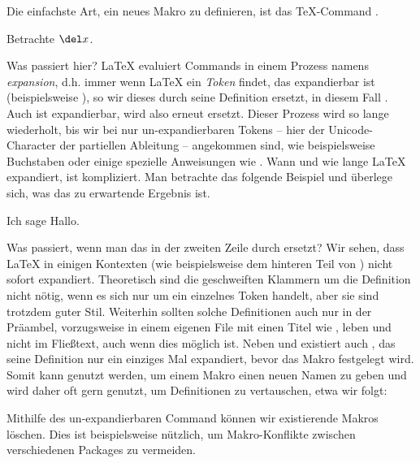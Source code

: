 Die einfachste Art, ein neues Makro zu definieren, ist das \TeX -Command .
\begin{latexlisting}
	\def\derivative{\del}

	Betrachte $\derivative x$.
\end{latexlisting}
Was passiert hier?
\LaTeX{} evaluiert Commands in einem Prozess namens \emph{expansion}, d.h. immer wenn \LaTeX{} ein \emph{Token} findet, das expandierbar ist (beispielsweise ), so wir dieses durch seine Definition ersetzt, in diesem Fall .
Auch  ist expandierbar, wird also erneut ersetzt.
Dieser Prozess wird so lange wiederholt, bis wir bei nur un-expandierbaren Tokens -- hier der Unicode-Character der partiellen Ableitung -- angekommen sind, wie beispielsweise Buchstaben oder einige spezielle Anweisungen wie .
Wann und wie lange \LaTeX{} expandiert, ist kompliziert.
Man betrachte das folgende Beispiel und überlege sich, was das zu erwartende Ergebnis ist.
\begin{latexlisting}
	\def\aaa{Hello}
	\def\bbb{\aaa}
	\def\aaa{Hallo}

	Ich sage \bbb .
\end{latexlisting}
Was passiert, wenn man das  in der zweiten Zeile durch  ersetzt?
Wir sehen, dass \LaTeX{} in einigen Kontexten (wie beispielsweise dem hinteren Teil von ) nicht sofort expandiert.
Theoretisch sind die geschweiften Klammern um die Definition nicht nötig, wenn es sich nur um ein einzelnes Token handelt, aber sie sind trotzdem guter Stil.
Weiterhin sollten solche Definitionen auch nur in der Präambel, vorzugsweise in einem eigenen File mit einen Titel wie , leben und nicht im Fließtext, auch wenn dies möglich ist.
Neben  und  existiert auch , das seine Definition nur ein einziges Mal expandiert, bevor das Makro festgelegt wird.
Somit kann  genutzt werden, um einem Makro einen neuen Namen zu geben und wird daher oft gern genutzt, um Definitionen zu vertauschen, etwa wir folgt:
\begin{latexlisting}
	\let\oldepsilon\epsilon
	\let\epsilon\varepsilon
	\let\varepsilon\oldepsilon
\end{latexlisting}
Mithilfe des un-expandierbaren Command  können wir existierende Makros löschen.
Dies ist beispielsweise nützlich, um Makro-Konflikte zwischen verschiedenen Packages zu vermeiden.
\begin{latexlisting}
	\usepackage{nchairx}
	\let\unit\undefined
	\usepackage{siunitx}
\end{latexlisting}

